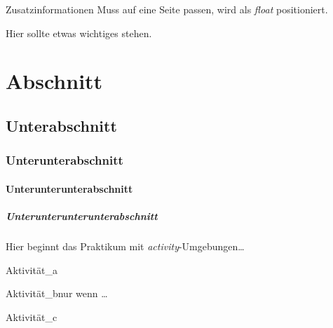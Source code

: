 \lipsum[1-4] 

\begin{excursus}{Zusatzinformationen}
    Muss auf eine Seite passen, wird als \textit{float} positioniert.
    \par\lipsum[1-2]
\end{excursus}

\lipsum[8-10]
\lipsum[11-12]

\begin{remark}
    Hier sollte etwas wichtiges stehen.
\end{remark}
\section{Abschnitt}
\lipsum[13]
\subsection{Unterabschnitt}
\lipsum[14]
\subsubsection{Unterunterabschnitt}
\lipsum[15]
\paragraph{Unterunterunterabschnitt}
\lipsum[16]
\subparagraph{Unterunterunterunterabschnitt}
\lipsum[17]

\varactivitiessection
Hier beginnt das Praktikum mit \textit{activity}-Umgebungen\dots

\lipsum[17]

\begin{activity}{Aktivität\_a}{}
    \lipsum[18-19]
\end{activity}

\begin{activity}{Aktivität\_b}{nur wenn \dots}
    \lipsum[20]
\end{activity}

\lipsum[20]

\begin{activity}{Aktivität\_c}{}
    \lipsum[22]
\end{activity}
